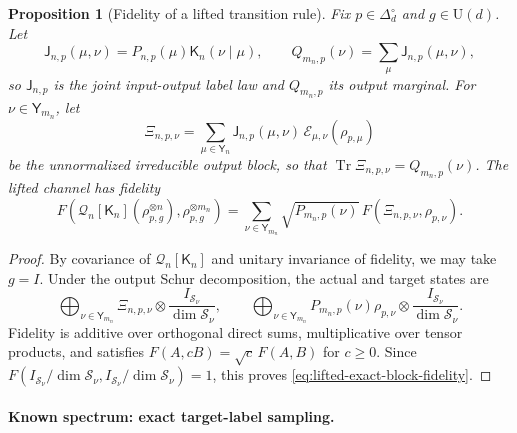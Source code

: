 \documentclass[11pt]{article}
\newtheorem{proposition}[proposition]{Proposition}
\theoremstyle{remark}
\theoremstyle{plain}
\newcommand{\cE}{\mathcal E}
\newcommand{\cS}{\mathcal S}
\newcommand{\U}{\mathrm U}
\newcommand{\Tr}{\operatorname{Tr}}
\newcommand{\ot}{\otimes}
\begin{document}
\begin{proposition}[Fidelity of a lifted transition rule]
\label{prop:lifted-kernel-bound}
Fix \(p\in\Delta_d^\circ\) and \(g\in\U(d)\).  Let
\begin{equation}\label{eq:lifted-label-laws}
  \mathsf J_{n,p}(\mu,\nu)=P_{n,p}(\mu)\mathsf K_n(\nu\mid\mu),
  \qquad
  Q_{m_n,p}(\nu)=\sum_\mu\mathsf J_{n,p}(\mu,\nu),
\end{equation}
so \(\mathsf J_{n,p}\) is the joint input-output label law and \(Q_{m_n,p}\)
its output marginal.  For \(\nu\in\mathsf Y_{m_n}\), let
\begin{equation}\label{eq:lifted-output-block}
  \Xi_{n,p,\nu}
  =\sum_{\mu\in\mathsf Y_n}\mathsf J_{n,p}(\mu,\nu)\,\cE_{\mu,\nu}(\rho_{p,\mu})
\end{equation}
be the unnormalized irreducible output block, so that
\(\Tr\Xi_{n,p,\nu}=Q_{m_n,p}(\nu)\).
The lifted channel has fidelity
\begin{equation}\label{eq:lifted-exact-block-fidelity}
  F\!\left(
    \mathcal Q_n[\mathsf K_n](\rho_{p,g}^{\ot n}),
    \rho_{p,g}^{\ot m_n}
  \right)
  =\sum_{\nu\in\mathsf Y_{m_n}}
   \sqrt{P_{m_n,p}(\nu)}\,F(\Xi_{n,p,\nu},\rho_{p,\nu}).
\end{equation}
\end{proposition}

\begin{proof}
By covariance of \(\mathcal Q_n[\mathsf K_n]\) and unitary invariance of fidelity,
we may take \(g=I\).  Under the output Schur decomposition, the actual and
target states are
\[
 \bigoplus_{\nu\in\mathsf Y_{m_n}}
 \Xi_{n,p,\nu}\ot\frac{I_{\cS_\nu}}{\dim\cS_\nu},
 \qquad
 \bigoplus_{\nu\in\mathsf Y_{m_n}}
 P_{m_n,p}(\nu)\rho_{p,\nu}
 \ot\frac{I_{\cS_\nu}}{\dim\cS_\nu}.
\]
Fidelity is additive over orthogonal direct sums, multiplicative over
tensor products, and satisfies \(F(A,cB)=\sqrt c\,F(A,B)\) for \(c\ge0\).
Since \(F(I_{\cS_\nu}/\dim\cS_\nu,I_{\cS_\nu}/\dim\cS_\nu)=1\), this proves
\eqref{eq:lifted-exact-block-fidelity}.
\end{proof}

\paragraph{Known spectrum: exact target-label sampling.}
\end{document}
